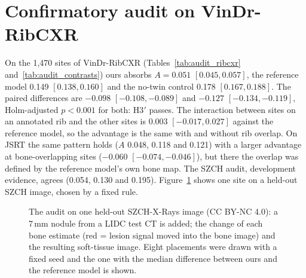 \section{Confirmatory audit on VinDr-RibCXR}
On the 1,470 sites of VinDr-RibCXR (Tables~\ref{tab:audit_ribcxr} and~\ref{tab:audit_contrasts}) ours absorbs $A=0.051$ $[0.045,0.057]$,
the reference model 0.149 $[0.138,0.160]$ and the no-twin control 0.178 $[0.167,0.188]$. The paired differences are $-0.098$
$[-0.108,-0.089]$ and $-0.127$ $[-0.134,-0.119]$, Holm-adjusted $p<0.001$ for both: H3$'$ passes. The interaction between sites on an annotated
rib and the other sites is $0.003$ $[-0.017,0.027]$ against the reference model, so the advantage is the same with and without rib overlap. On
JSRT the same pattern holds ($A$ 0.048, 0.118 and 0.121) with a larger advantage at bone-overlapping sites ($-0.060$ $[-0.074,-0.046]$), but
there the overlap was defined by the reference model's own bone map. The SZCH audit, development evidence, agrees (0.054, 0.130 and 0.195).
Figure~\ref{fig:audit_maps} shows one site on a held-out SZCH image, chosen by a fixed rule.
\begin{table}[htbp]
\centering\small
\caption{Counterfactual lesion audit on VinDr-RibCXR: mean absorption per method with image-cluster bootstrap intervals (lower is better).}
\label{tab:audit_ribcxr}
\end{table}
\begin{table}[htbp]
\centering\small
\caption{Paired site-level contrasts on the three audit sets, Holm over the two contrasts, and the interaction with bone overlap
($\geq$15\,\% vs.\ $<$15\,\%). SZCH is development evidence; the JSRT overlap comes from the reference model's bone map.}
\label{tab:audit_contrasts}
\end{table}
\begin{figure}[htbp]
\centering
{}
\caption{The audit on one held-out SZCH-X-Rays image (CC BY-NC 4.0): a 7\,mm nodule from a LIDC test CT is added; the change of each bone
estimate (red = lesion signal moved into the bone image) and the resulting soft-tissue image. Eight placements were drawn with a fixed seed and
the one with the median difference between ours and the reference model is shown.}
\label{fig:audit_maps}
\end{figure}


